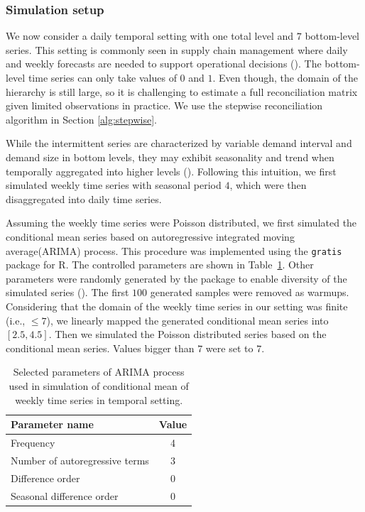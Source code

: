 \documentclass[a4paper,review,12pt,authoryear]{elsarticle}
\let\code=\texttt
\let\proglang=\textsf
\begin{document}
\subsubsection{Simulation setup}

We now consider a daily temporal setting with one total level and $7$ bottom-level series. 
This setting is commonly seen in supply chain management where daily and weekly forecasts are needed to support operational decisions (\citealp{syntetosSupplyChainForecasting2016}).
The bottom-level time series can only take values of $0$ and $1$. 
Even though, the domain of the hierarchy is still large, so it is challenging to estimate a full reconciliation matrix given limited observations in practice. 
We use the stepwise reconciliation algorithm in Section \ref{alg:stepwise}. 



While the intermittent series are characterized by variable demand interval and demand size in bottom levels, they may exhibit seasonality and trend when temporally aggregated into higher levels ().
Following this intuition, we first simulated weekly time series with seasonal period $4$, which were then disaggregated into daily time series.

Assuming the weekly time series were Poisson distributed, we first simulated the conditional mean series based on autoregressive integrated moving average(ARIMA)  process. This procedure was implemented using the \code{gratis} package for \proglang{R}. 
The controlled parameters are shown in Table~\ref{tab:parameters}. Other parameters were randomly generated by the package to enable diversity of the simulated series (). 
The first $100$ generated samples were removed as warmups.
Considering that the domain of the weekly time series in our setting was finite (i.e., $\leq 7$), we linearly mapped the generated conditional mean series into $[2.5, 4.5]$. 
Then we simulated the Poisson distributed series based on the conditional mean series. Values bigger than $7$ were set to $7$.

\begin{table}[h]
  \centering
  \caption{\label{tab:parameters} Selected parameters of ARIMA process used in simulation of conditional mean of weekly time series in temporal setting.}
  \begin{tabular}{lc}
    \toprule
    Parameter name & Value \\ \midrule
    Frequency & 4 \\
    Number of autoregressive terms & 3 \\
    Difference order & 0 \\
    Seasonal difference order & 0 \\ \bottomrule
  \end{tabular}
\end{table}
\end{document}
